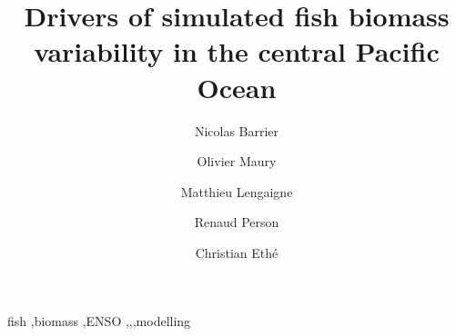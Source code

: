 \documentclass[review]{elsarticle}
\begin{document}
\begin{frontmatter}

\title{Drivers of simulated fish biomass variability in the central Pacific Ocean}

\author[mymainaddress]{Nicolas Barrier}

\author[mymainaddress]{Olivier Maury}
\author[mymainaddress]{Matthieu Lengaigne}
\author[renaud]{Renaud Person}
\author[chris]{Christian Eth\'{e}}


\address[mymainaddress]{MARBEC, Univ. Montpellier, CNRS, Ifremer, IRD, Sète, France}
\address[renaud]{LOCEAN, IRD}
\address[chris]{IPSL, CNRS}

\begin{abstract}

\end{abstract}

\begin{keyword}
fish \sep biomass \sep ENSO \sep \nino \sep \nina \sep modelling
\end{keyword}

\end{frontmatter}

\linenumbers

%
%
\newpage







\listoffigures
\listoftables

\clearpage


\end{document}

